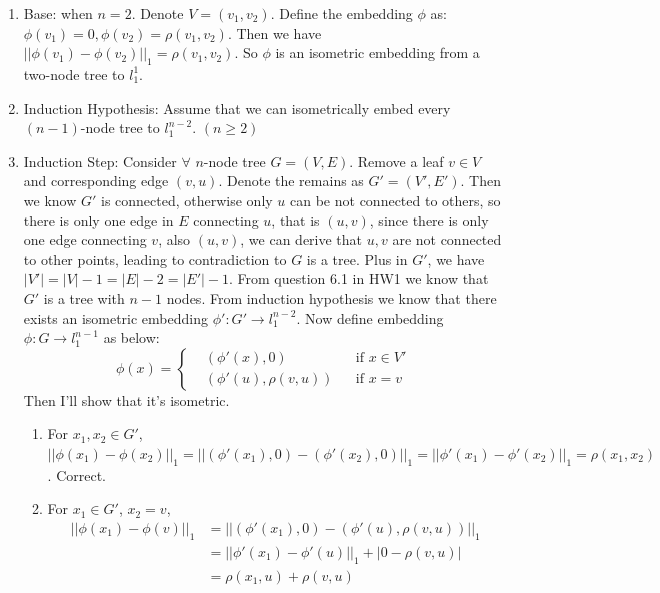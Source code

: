 \documentclass[twoside,11pt]{homework}
\begin{document}
\begin{enumerate}
    \item Base: when $n=2$. Denote $V = (v_1, v_2)$. Define the embedding $\phi$ as: $\phi(v_1)=0, \phi(v_2)=\rho(v_1,v_2)$. Then we have $||\phi(v_1)-\phi(v_2)||_1=\rho(v_1,v_2)$. So $\phi$ is an isometric embedding from a two-node tree to $l_1^1$.
    
    \item Induction Hypothesis: Assume that we can isometrically embed every $(n-1)$-node tree to $l_1^{n-2}$. $(n \geq 2)$
    
    \item Induction Step: Consider $\forall$ $n$-node tree $G=(V,E)$. Remove a leaf $v \in V$ and corresponding edge $(v,u)$. Denote the remains as $G'=(V',E')$. Then we know $G'$ is connected, otherwise only $u$ can be not connected to others, so there is only one edge in $E$ connecting $u$, that is $(u,v)$, since there is only one edge connecting $v$, also $(u,v)$, we can derive that $u,v$ are not connected to other points, leading to contradiction to $G$ is a tree. Plus in $G'$, we have $|V'| = |V| - 1 = |E| - 2 = |E'| - 1$. From question 6.1 in HW1 we know that $G'$ is a tree with $n-1$ nodes.
    \newline
    From induction hypothesis we know that there exists an isometric embedding $\phi': G' \rightarrow l_1^{n-2}$. Now define embedding $\phi: G \rightarrow l_1^{n-1}$ as below:
    \begin{equation*}
    \phi(x)=\left\{
    \begin{aligned}
    &(\phi'(x), 0) & &\text{if }x \in V' \\
    &(\phi'(u), \rho(v,u))& &\text{if }x = v
    \end{aligned}
    \right.
    \end{equation*}
    Then I'll show that it's isometric.
    
    \begin{enumerate}
        \item For $x_1,x_2 \in G'$, $||\phi(x_1)-\phi(x_2)||_1 = ||(\phi'(x_1),0) - (\phi'(x_2),0)||_1 =||\phi'(x_1) - \phi'(x_2)||_1 = \rho(x_1,x_2) $. Correct.
        
        \item For $x_1 \in G'$, $x_2=v$,
        \begin{align*}
            ||\phi(x_1)-\phi(v)||_1 &= ||(\phi'(x_1),0)-(\phi'(u), \rho(v,u))||_1\\
            &= ||\phi'(x_1) - \phi'(u)||_1 + |0-\rho(v,u)|\\
            &= \rho(x_1,u) + \rho(v,u)
        \end{align*}
        

\end{enumerate}
\end{enumerate}
\end{document}

